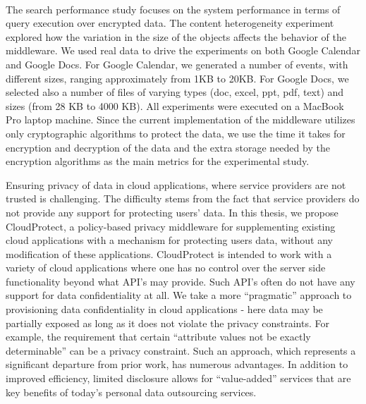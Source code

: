 \documentclass[11pt,onecolumn]{article}
\begin{document}
\paragraph{}
The search performance study focuses on the system performance in terms of query
execution over encrypted data. The content heterogeneity experiment explored how
the variation in the size of the objects affects the behavior of the middleware.
We used real data to drive the experiments on both Google Calendar and Google Docs.
For Google Calendar, we generated a number of events, with different sizes, ranging
approximately from 1KB to 20KB. For Google Docs, we selected also a number of
files of varying types (doc, excel, ppt, pdf, text) and sizes (from 28 KB to 4000 KB).
All experiments were executed on a MacBook Pro laptop machine.
Since the current implementation of the middleware utilizes only cryptographic algorithms
to protect the data, we use the time it takes for encryption and decryption
of the data and the extra storage needed by the encryption algorithms as the main
metrics for the experimental study.

Ensuring privacy of data in cloud applications, where service providers are not trusted
is challenging. The difficulty stems from the fact that service providers do not provide
any support for protecting users’ data. In this thesis, we propose CloudProtect, a
policy-based privacy middleware for supplementing existing cloud applications with
a mechanism for protecting users data, without any modification of these applications.
CloudProtect is intended to work with a variety of cloud applications where
one has no control over the server side functionality beyond what API’s may provide.
Such API’s often do not have any support for data confidentiality at all. We take
a more “pragmatic” approach to provisioning data confidentiality in cloud applications
- here data may be partially exposed as long as it does not violate the privacy
constraints. For example, the requirement that certain “attribute values not be exactly
determinable” can be a privacy constraint. Such an approach, which represents
a significant departure from prior work, has numerous advantages. In addition to improved efficiency, limited disclosure allows for “value-added” services that are key benefits of today’s personal data outsourcing services.
\end{document}
